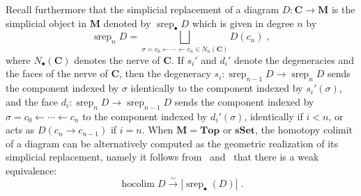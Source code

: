\documentclass{amsart}
\theoremstyle{definition}
\theoremstyle{remark}
\DeclareMathOperator{\hoc}{hocolim}
\DeclareMathOperator{\srep}{srep}
\newcommand{\ot}{\leftarrow}
\newcommand{\Cc}{\mathbf{C}}
\newcommand{\Mm}{\mathbf{M}}
\newcommand{\sset}{\mathbf{sSet}}
\renewcommand{\top}{\mathbf{Top}}
\begin{document}
Recall furthermore that the simplicial replacement of a diagram $D\colon\Cc\to \Mm$ is the simplicial object in $\Mm$ denoted by $\srep_\bullet D$ which is given in degree $n$ by 
\[
	\srep_nD=\bigsqcup_{\sigma =c_0\ot \cdots\ot c_{n}\in N_{n}(\Cc)} D(c_{n})\;,
\]
where $N_\bullet(\Cc)$ denotes the nerve of $\Cc$. If $s_i'$ and $d_i'$ denote the  degeneracies and the faces of the nerve of $\Cc$, then the degeneracy $s_i\colon\srep_{n-1}D\to \srep_{n}D$ sends the component indexed by $\sigma$ identically to the component indexed by $s_i'(\sigma)$, and the face $d_i\colon\srep_nD\to \srep_{n-1}D$ sends the component indexed by $\sigma=c_0\ot \cdots\ot c_{n}$ to the component indexed by $d_i'(\sigma)$, identically if $i<n$, or acts as $D(c_n\to c_{n-1})$ if $i=n$.
When $\Mm=\top$ or $\sset$, the homotopy colimit of a diagram can be alternatively computed as the geometric realization of its simplicial replacement, namely it follows from~\cite[Theorem~18.7.5~(1)]{hi-03} and~\cite[Corollary~A.6]{du-is-04} that there is a weak equivalence:
\[
	\hoc D \xrightarrow[]{\sim} |\srep_\bullet(D)|\;.
\]
\end{document}
